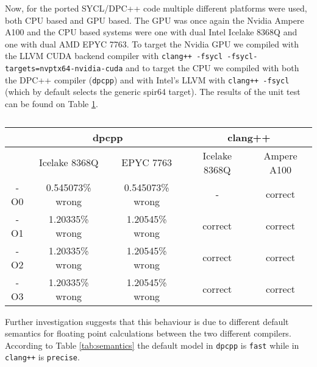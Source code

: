 Now, for the ported SYCL/DPC++ code multiple different platforms were used, both CPU based and GPU based. The GPU was once again the Nvidia Ampere A100 and the CPU based systems were one with dual Intel Icelake 8368Q and one with dual AMD EPYC 7763. To target the Nvidia GPU we compiled with the LLVM CUDA backend compiler with \texttt{clang++ -fsycl -fsycl-targets=nvptx64-nvidia-cuda} and to target the CPU we compiled with both the DPC++ compiler (\texttt{dpcpp}) and with Intel's LLVM with \texttt{clang++ -fsycl} (which by default selects the generic spir64 target). The results of the unit test can be found on Table \ref{tab:correctness}.

\begin{center}
	\begin{table}
		\begin{tabular}{||c c c c c||}
			\hline
			    & \multicolumn{2}{c}{dpcpp} & \multicolumn{2}{c||}{clang++}                               \\ [0.5ex]
			\hline
			    & Icelake 8368Q             & EPYC 7763                     & Icelake 8368Q & Ampere A100 \\ [0.5ex]
			\hline\hline
			-O0 & 0.545073\% wrong          & 0.545073\% wrong              & -             & correct     \\ [0.3ex]
			\hline
			-O1 & 1.20335\% wrong           & 1.20545\% wrong               & correct       & correct     \\ [0.3ex]
			\hline
			-O2 & 1.20335\% wrong           & 1.20545\% wrong               & correct       & correct     \\ [0.3ex]
			\hline
			-O3 & 1.20335\% wrong           & 1.20545\% wrong               & correct       & correct     \\ [0.3ex]
			\hline
		\end{tabular}
		\caption{\label{tab:correctness}}
	\end{table}
\end{center}

Further investigation suggests that this behaviour is due to different default semantics for floating point calculations between the two different compilers. According to Table \ref{tab:semantics} the default model in \texttt{dpcpp} is \texttt{fast} while in \texttt{clang++} is \texttt{precise}.

